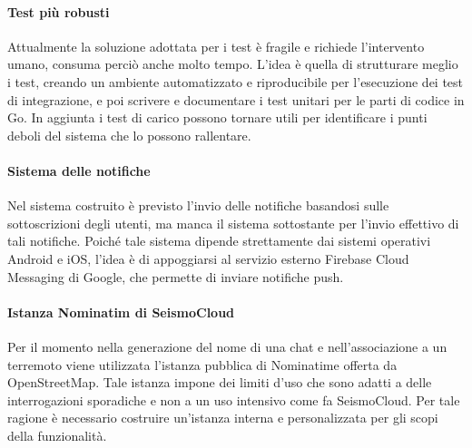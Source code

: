 \paragraph{Test più robusti} Attualmente la soluzione adottata per i test è fragile e richiede l'intervento umano, consuma perciò anche molto tempo. L'idea è quella di strutturare meglio i test, creando un ambiente automatizzato e riproducibile per l'esecuzione dei test di integrazione, e poi scrivere e documentare i test unitari per le parti di codice in Go. In aggiunta i test di carico possono tornare utili per identificare i punti deboli del sistema che lo possono rallentare.

\paragraph{Sistema delle notifiche} Nel sistema costruito è previsto l'invio delle notifiche basandosi sulle sottoscrizioni degli utenti, ma manca il sistema sottostante per l'invio effettivo di tali notifiche. Poiché tale sistema dipende strettamente dai sistemi operativi Android e iOS, l'idea è di appoggiarsi al servizio esterno Firebase Cloud Messaging di Google, che permette di inviare notifiche push.

\paragraph{Istanza Nominatim di SeismoCloud} Per il momento nella generazione del nome di una chat e nell'associazione a un terremoto viene utilizzata l'istanza pubblica di Nominatime offerta da OpenStreetMap. Tale istanza impone dei limiti d'uso che sono adatti a delle interrogazioni sporadiche e non a un uso intensivo come fa SeismoCloud. Per tale ragione è necessario costruire un'istanza interna e personalizzata per gli scopi della funzionalità.

